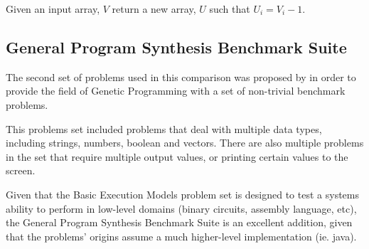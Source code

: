 Given an input array, $V$ return a new array, $U$ such that $U_i = V_i - 1$.


\subsection{General Program Synthesis Benchmark Suite}
The second set of problems used in this comparison was proposed by \cite{Helmuth2015b} in order to provide the field of Genetic Programming with a set of non-trivial benchmark problems.

This problems set included problems that deal with multiple data types, including strings, numbers, boolean and vectors. There are also multiple problems in the set that require multiple output values, or printing certain values to the screen.

Given that the Basic Execution Models problem set is designed to test a systems ability to perform in low-level domains (binary circuits, assembly language, etc), the General Program Synthesis Benchmark Suite is an excellent addition, given that the problems' origins assume a much higher-level implementation (ie. java).

